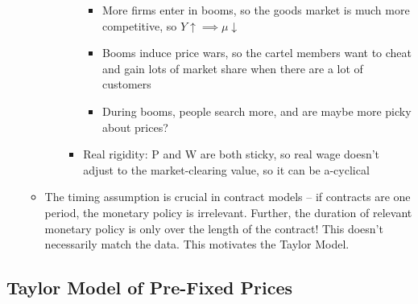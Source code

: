 \documentclass[12pt]{article}
\begin{document}
\begin{itemize}
\begin{itemize}
\begin{itemize}
\begin{itemize}
                \begin{itemize}
                    \item More firms enter in booms, so the goods market is much more competitive, so $Y \uparrow \implies \mu \downarrow$
                    \item Booms induce price wars, so the cartel members want to cheat and gain lots of market share when there are a lot of customers
                    \item During booms, people search more, and are maybe more picky about prices?
                \end{itemize}
                \item Real rigidity: P and W are both sticky, so real wage doesn't adjust to the market-clearing value, so it can be a-cyclical
            \end{itemize}
        \end{itemize}
        \item The timing assumption is crucial in contract models -- if contracts are one period, the monetary policy is irrelevant. Further, the duration of relevant monetary policy is only over the length of the contract! This doesn't necessarily match the data. This motivates the Taylor Model.
    \end{itemize}
\end{itemize}

\subsection{Taylor Model of Pre-Fixed Prices}
\end{document}
